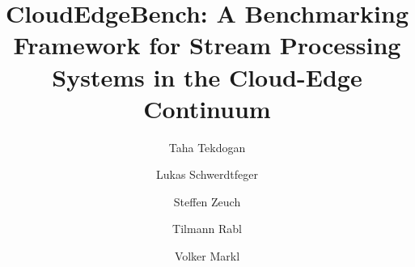 \documentclass[runningheads]{llncs}
\begin{document}
%
\title{CloudEdgeBench: A Benchmarking Framework for Stream Processing Systems in the Cloud-Edge Continuum}
%
%
\author{Taha Tekdogan \and
Lukas Schwerdtfeger \and
Steffen Zeuch \and
Tilmann Rabl \and
Volker Markl%
}
%
%
%
\maketitle              %
%
\end{document}
